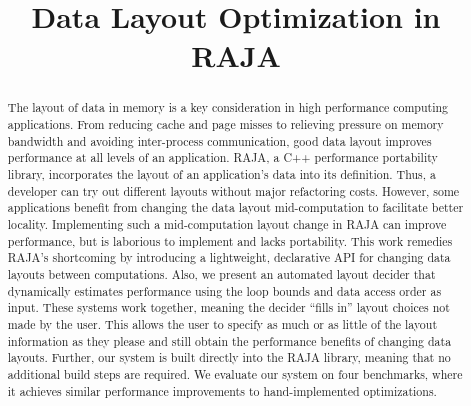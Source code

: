 \documentclass[sigconf, table]{acmart}
\title{Data Layout Optimization in RAJA}
\newcommand{\todo}[1]{{\textcolor{red}{{\tt{TODO:}}\,\,#1 }}}
\begin{document}
\begin{abstract}



The layout of data in memory is a key consideration in high performance computing applications.
From reducing cache and page misses to relieving pressure on memory bandwidth and avoiding inter-process communication, good data layout improves performance at all levels of an application.
RAJA, a C++ performance portability library, incorporates the layout of an application's data into its definition.
Thus, a developer can try out different layouts without major refactoring costs.
However, some applications benefit from changing the data layout mid-computation to facilitate better locality.
Implementing such a mid-computation layout change in RAJA can improve performance, but is laborious to implement and lacks portability.
This work remedies RAJA's shortcoming by introducing a lightweight, declarative API for changing data layouts between computations.
Also, we present an automated layout decider that dynamically estimates performance using the loop bounds and data access order as input. 
These systems work together, meaning the decider \enquote{fills in} layout choices not made by the user.
This allows the user to specify as much or as little of the layout information as they please and still obtain the performance benefits of changing data layouts.  
Further, our system is built directly into the RAJA library, meaning that no additional build steps are required.
We evaluate our system on four benchmarks, where it achieves similar performance improvements to hand-implemented optimizations.
\end{abstract}
\end{document}
